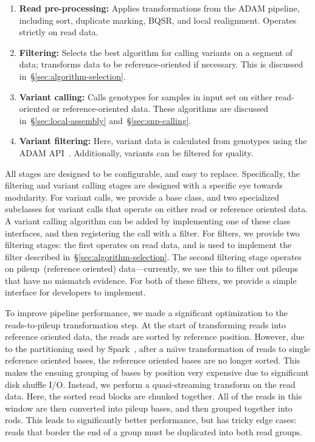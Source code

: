 \documentclass{acm_proc_article-sp}
\begin{document}
\begin{enumerate}
\item \textbf{Read pre-processing:} Applies transformations from the ADAM pipeline, including sort, duplicate marking, BQSR, and
local realignment. Operates strictly on read data.
\item \textbf{Filtering:} Selects the best algorithm for calling variants on a segment of data; transforms data to be reference-oriented
if necessary. This is discussed in~\S\ref{sec:algorithm-selection}.
\item \textbf{Variant calling:} Calls genotypes for samples in input set on either read-oriented or reference-oriented data. These
algorithms are discussed in~\S\ref{sec:local-assembly} and~\S\ref{sec:snp-calling}.
\item \textbf{Variant filtering:} Here, variant data is calculated from genotypes using the ADAM API~\cite{massie13}. Additionally,
variants can be filtered for quality.
\end{enumerate}

All stages are designed to be configurable, and easy to replace. Specifically, the filtering and variant calling stages are designed
with a specific eye towards modularity. For variant calls, we provide a base class, and two specialized subclasses for variant
calls that operate on either read or reference oriented data. A variant calling algorithm can be added by implementing one
of these class interfaces, and then registering the call with a filter. For filters, we provide two filtering stages: the first operates
on read data, and is used to implement the filter described in~\S\ref{sec:algorithm-selection}. The second filtering stage operates
on pileup~(reference oriented) data---currently, we use this to filter out pileups that have no mismatch evidence. For both of these
filters, we provide a simple interface for developers to implement.

To improve pipeline performance, we made a significant optimization to the reads-to-pileup transformation step. At the start of
transforming reads into reference oriented data, the reads are sorted by reference position. However, due to the partitioning
used by Spark~\cite{zaharia10}, after a na\"{\i}ve transformation of reads to single reference oriented bases, the reference
oriented bases are no longer sorted. This makes the ensuing grouping of bases by position very expensive due to significant disk
shuffle I/O. Instead, we perform a quasi-streaming transform on the read data. Here, the sorted read blocks are chunked together.
All of the reads in this window are then converted into pileup bases, and then grouped together into rods. This leads to significantly
better performance, but has tricky edge cases: reads that border the end of a group must be duplicated into both read groups.
\end{document}
